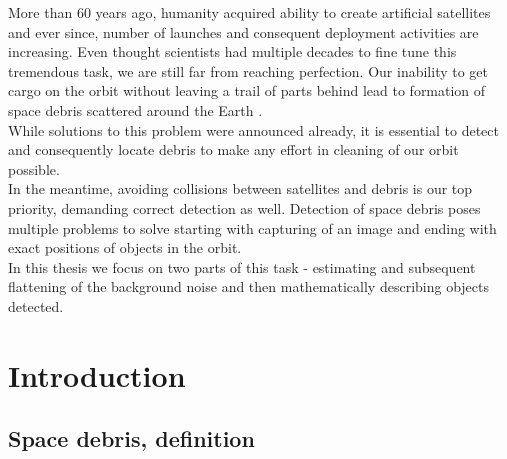 \documentclass[12pt, a4paper, oneside]{book}
\begin{document}
More than 60 years ago, humanity acquired ability to create artificial satellites and ever since, number of launches and consequent deployment activities are increasing.
Even thought scientists had multiple decades to fine tune this tremendous task, we are still far from reaching perfection.
Our inability to get cargo on the orbit without leaving a trail of parts behind lead to formation of space debris scattered around the Earth \cite{klinkrad}. \\
While solutions to this problem were announced already, it is essential to detect and consequently locate debris to make any effort in cleaning of our orbit possible.\\
In the meantime, avoiding collisions between satellites and debris is our top priority, demanding correct detection as well.
Detection of space debris poses multiple problems to solve starting with capturing of an image and ending with exact positions of objects in the orbit.\\
In this thesis we focus on two parts of this task - estimating and subsequent flattening of the background noise and then mathematically describing objects detected.

\chapter{Introduction}

\section{Space debris, definition}
\end{document}
